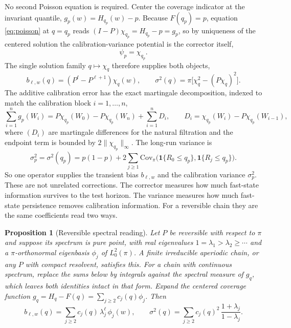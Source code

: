 \documentclass[11pt]{article}
\newtheorem{proposition}[theorem]{Proposition}
\theoremstyle{definition}
\theoremstyle{remark}
\newcommand{\Cov}{\mathrm{Cov}}
\newcommand{\one}{\mathbf{1}}
\begin{document}
No second Poisson equation is required. Center the coverage indicator at the invariant
quantile, $g_p(w)=H_{q_p}(w)-p$. Because $F(q_p)=p$, equation \eqref{eq:poisson} at $q=q_p$
reads $(I-P)\chi_{q_p}=H_{q_p}-p=g_p$, so by uniqueness of the centered solution the
calibration-variance potential is the corrector itself,
\begin{equation}\label{eq:psi-is-chi}
  \psi_p = \chi_{q_p} .
\end{equation}
The single solution family $q\mapsto\chi_q$ therefore supplies both objects,
\begin{equation}\label{eq:unified}
  b_{\ell,w}(q) = (P^{\ell}-P^{\ell+1})\chi_q(w),
  \qquad
  \sigma^2(q) = \pi\big[\chi_q^2 - (P\chi_q)^2\big] .
\end{equation}
The additive calibration error has the exact martingale decomposition, indexed to match the
calibration block $i=1,\dots,n$,
\begin{equation}\label{eq:martingale}
  \sum_{i=1}^{n} g_p(W_i) = P\chi_{q_p}(W_0) - P\chi_{q_p}(W_n) + \sum_{i=1}^{n} D_i,
  \qquad D_i = \chi_{q_p}(W_i) - P\chi_{q_p}(W_{i-1}),
\end{equation}
where $(D_i)$ are martingale differences for the natural filtration and the endpoint term is
bounded by $2\|\chi_{q_p}\|_\infty$. The long-run variance is
\begin{equation}\label{eq:lrv}
  \sigma_p^2 = \sigma^2(q_p)
    = p(1-p) + 2\sum_{j\ge1}\Cov_\pi\big(\one\{R_0\le q_p\},\one\{R_j\le q_p\}\big) .
\end{equation}
So one operator supplies the transient bias $b_{\ell,w}$ and the calibration variance
$\sigma_p^2$. These are not unrelated corrections. The corrector measures how much fast-state
information survives to the test horizon. The variance measures how much fast-state
persistence removes calibration information. For a reversible chain they are the same
coefficients read two ways.

\begin{proposition}[Reversible spectral reading]\label{prop:spectral}
Let $P$ be reversible with respect to $\pi$ and suppose its spectrum is pure point, with real
eigenvalues $1=\lambda_1>\lambda_2\ge\cdots$ and a $\pi$-orthonormal eigenbasis $\phi_j$ of
$L^2_0(\pi)$. A finite irreducible aperiodic chain, or any $P$ with compact resolvent, satisfies
this. For a chain with continuous spectrum, replace the sums below by integrals against the
spectral measure of $g_q$, which leaves both identities intact in that form. Expand the centered coverage function
$g_q=H_q-F(q)=\sum_{j\ge2}c_j(q)\phi_j$. Then
\begin{equation}\label{eq:spectral}
  b_{\ell,w}(q) = \sum_{j\ge2} c_j(q)\,\lambda_j^{\ell}\,\phi_j(w),
  \qquad
  \sigma^2(q) = \sum_{j\ge2} c_j(q)^2\,\frac{1+\lambda_j}{1-\lambda_j} .
\end{equation}
\end{proposition}
\end{document}
